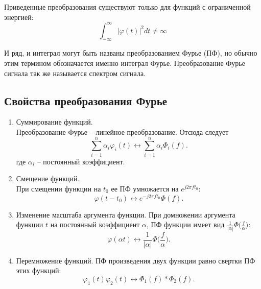 \documentclass[a4paper,14pt]{extarticle}
\begin{document}
Приведенные преобразования существуют только для функций с ограниченной энергией:
\begin{equation*}
\int_{-\infty}^{\infty} |\varphi (t)|^2 dt \neq \infty
\end{equation*}

И ряд, и интеграл могут быть названы преобразованием Фурье (ПФ), но обычно этим термином обозначается именно интеграл Фурье. Преобразование Фурье сигнала так же называется спектром сигнала.

\subsection{Свойства преобразования Фурье}

\begin{enumerate}

\item Суммирование функций. \\ Преобразование Фурье -- линейное преобразование. Отсюда следует 
\begin{equation*}
\sum_{i=1}^n \alpha_i \varphi_i (t) \leftrightarrow  \sum_{i=1}^n \alpha_i \Phi_i (f).
\end{equation*}   
где $\alpha_i$ -- постоянный коэффициент.

\item Смещение функций. \\ При смещении функции на $t_0$ ее ПФ умножается на $e^{j 2 \pi f t_0}$:
\begin{equation*}
\varphi (t - t_0) \leftrightarrow e^{-j 2 \pi f t_0} \Phi (f).
\end{equation*}

\item Изменение масштаба аргумента функции.
При домножении аргумента функции $t$ на постоянный коэффициент $\alpha$, ПФ функции имеет вид $\frac{1}{|\alpha|} \Phi \big(\frac{f}{\alpha}\big)$:
\begin{equation*}
\varphi(\alpha t) \leftrightarrow \frac{1}{|\alpha|} \Phi \bigg(\frac{f}{\alpha}\bigg).
\end{equation*}

\item Перемножение функций.  ПФ произведения двух функции равно свертки ПФ этих функций:
\begin{equation*}
\varphi_1 (t) \varphi_2 (t) \leftrightarrow \Phi_1(f) * \Phi_2(f). 
\end{equation*}


\end{enumerate}
\end{document}
